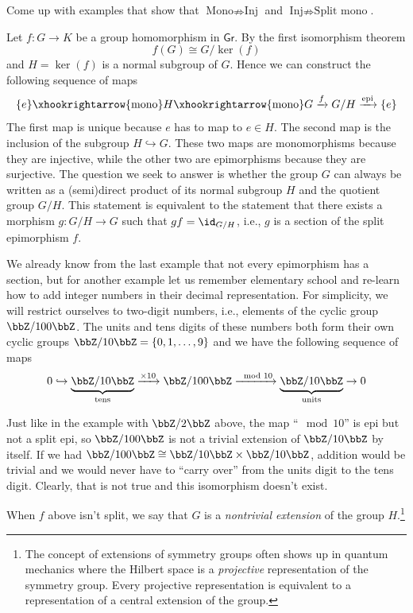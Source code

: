 \begin{xca}
    Come up with examples that show that $\text{Mono}\nRightarrow\text{Inj}$
    and $\text{Inj}\nRightarrow\text{Split mono}$.
\end{xca}
\begin{example}
    Let $f:G\rightarrow K$ be a group homomorphism in $\mathsf{Gr}$.
    By the first isomorphism theorem 
    \begin{equation}
        f(G)\cong G/\ker(f)
    \end{equation}
    and $H=\ker(f)$ is a normal subgroup of $G$. Hence we can construct
    the following sequence of maps
    \begin{equation}
        \{e\}\xhookrightarrow{\text{mono}}H\xhookrightarrow{\text{mono}}G\xrightarrow{f}G/H\xrightarrow{\text{epi}}\{e\}
    \end{equation}
    The first map is unique because $e$ has to map to $e\in H$. The second map is the inclusion of the subgroup $H\hookrightarrow G$. These two maps are monomorphisms because they are injective, while
    the other two are epimorphisms because they are surjective. The question
    we seek to answer is whether the group $G$ can always be written as
    a (semi)direct product of its normal subgroup $H$ and the quotient group $G/H$.
    This statement is equivalent to the statement that there exists a morphism
    $g:G/H\rightarrow G$ such that $gf=\id_{G/H}$, i.e., $g$ is a section
    of the split epimorphism $f$. 

    We already know from the last example that not every epimorphism has a section, but for another example let us remember elementary school and
    re-learn how to add integer numbers in their decimal representation. For simplicity, we will restrict ourselves
    to two-digit numbers, i.e., elements of the cyclic group $\bbZ/100\bbZ$.
    The units and tens digits of these numbers both form their own cyclic
    groups $\bbZ/10\bbZ=\{0,1,\ldots,9\}$ and we have the following
    sequence of maps 
    \begin{equation}
    0\hookrightarrow\underbrace{\bbZ/10\bbZ}_\text{tens}\xrightarrow{\times10}\bbZ/100\bbZ\xrightarrow{\mod 10}\underbrace{\bbZ/10\bbZ}_\text{units}\rightarrow0
    \end{equation}

    Just like in the example with $\bbZ/2\bbZ$ above, the map ``$\mod 10$'' is epi but not a split epi, so $\bbZ/100\bbZ$ is not a trivial extension of $\bbZ/10\bbZ$ by itself. If we had $\bbZ/100\bbZ\cong\bbZ/10\bbZ\times\bbZ/10\bbZ$,
    addition would be trivial and we would never have to ``carry over''
    from the units digit to the tens digit. Clearly, that is not true
    and this isomorphism doesn't exist. 

    When $f$ above isn't split, we say that $G$ is a \emph{nontrivial extension}
    of the group $H$.\footnote{The concept of extensions of symmetry groups often shows up in quantum
    mechanics where the Hilbert space is a \emph{projective} representation of
    the symmetry group. Every projective representation is equivalent to a representation of a central
    extension of the group.}
\end{example}
